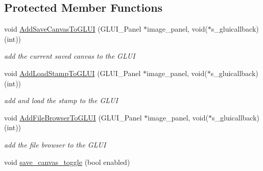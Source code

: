\subsection*{Protected Member Functions}
\begin{DoxyCompactItemize}
\item 
void \hyperlink{classimage__tools_1_1IOManager_a600cf7d9a1b1a86cbb2201fc7ec7b528}{Add\+Save\+Canvas\+To\+G\+L\+UI} (G\+L\+U\+I\+\_\+\+Panel $\ast$image\+\_\+panel, void($\ast$s\+\_\+gluicallback)(int))\hypertarget{classimage__tools_1_1IOManager_a600cf7d9a1b1a86cbb2201fc7ec7b528}{}\label{classimage__tools_1_1IOManager_a600cf7d9a1b1a86cbb2201fc7ec7b528}

\begin{DoxyCompactList}\small\item\em add the current saved canvas to the G\+L\+UI \end{DoxyCompactList}\item 
void \hyperlink{classimage__tools_1_1IOManager_a39e6a658f7d97741e09c1cec9ad08396}{Add\+Load\+Stamp\+To\+G\+L\+UI} (G\+L\+U\+I\+\_\+\+Panel $\ast$image\+\_\+panel, void($\ast$s\+\_\+gluicallback)(int))\hypertarget{classimage__tools_1_1IOManager_a39e6a658f7d97741e09c1cec9ad08396}{}\label{classimage__tools_1_1IOManager_a39e6a658f7d97741e09c1cec9ad08396}

\begin{DoxyCompactList}\small\item\em add and load the stamp to the G\+L\+UI \end{DoxyCompactList}\item 
void \hyperlink{classimage__tools_1_1IOManager_a078d05c79a2a954c38050aa4f4985768}{Add\+File\+Browser\+To\+G\+L\+UI} (G\+L\+U\+I\+\_\+\+Panel $\ast$image\+\_\+panel, void($\ast$s\+\_\+gluicallback)(int))\hypertarget{classimage__tools_1_1IOManager_a078d05c79a2a954c38050aa4f4985768}{}\label{classimage__tools_1_1IOManager_a078d05c79a2a954c38050aa4f4985768}

\begin{DoxyCompactList}\small\item\em add the file browser to the G\+L\+UI \end{DoxyCompactList}\item 
void \hyperlink{classimage__tools_1_1IOManager_abeb5355f6d3e08847d715dc910a2236b}{save\+\_\+canvas\+\_\+toggle} (bool enabled)\hypertarget{classimage__tools_1_1IOManager_abeb5355f6d3e08847d715dc910a2236b}{}\label{classimage__tools_1_1IOManager_abeb5355f6d3e08847d715dc910a2236b}


\end{DoxyCompactItemize}
